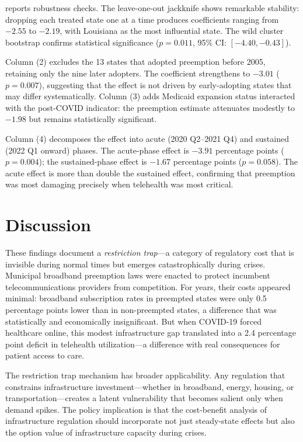 \documentclass[12pt]{article}
\begin{document}
 reports robustness checks. The leave-one-out jackknife shows remarkable stability: dropping each treated state one at a time produces coefficients ranging from $-2.55$ to $-2.19$, with Louisiana as the most influential state. The wild cluster bootstrap confirms statistical significance ($p = 0.011$, 95\% CI: $[-4.40, -0.43]$).

Column (2) excludes the 13 states that adopted preemption before 2005, retaining only the nine later adopters. The coefficient strengthens to $-3.01$ ($p = 0.007$), suggesting that the effect is not driven by early-adopting states that may differ systematically. Column (3) adds Medicaid expansion status interacted with the post-COVID indicator: the preemption estimate attenuates modestly to $-1.98$ but remains statistically significant.

Column (4) decomposes the effect into acute (2020 Q2--2021 Q4) and sustained (2022 Q1 onward) phases. The acute-phase effect is $-3.91$ percentage points ($p = 0.004$); the sustained-phase effect is $-1.67$ percentage points ($p = 0.058$). The acute effect is more than double the sustained effect, confirming that preemption was most damaging precisely when telehealth was most critical.




\section{Discussion}

These findings document a \textit{restriction trap}---a category of regulatory cost that is invisible during normal times but emerges catastrophically during crises. Municipal broadband preemption laws were enacted to protect incumbent telecommunications providers from competition. For years, their costs appeared minimal: broadband subscription rates in preempted states were only 0.5 percentage points lower than in non-preempted states, a difference that was statistically and economically insignificant. But when COVID-19 forced healthcare online, this modest infrastructure gap translated into a 2.4 percentage point deficit in telehealth utilization---a difference with real consequences for patient access to care.

The restriction trap mechanism has broader applicability. Any regulation that constrains infrastructure investment---whether in broadband, energy, housing, or transportation---creates a latent vulnerability that becomes salient only when demand spikes. The policy implication is that the cost-benefit analysis of infrastructure regulation should incorporate not just steady-state effects but also the option value of infrastructure capacity during crises.
\end{document}
